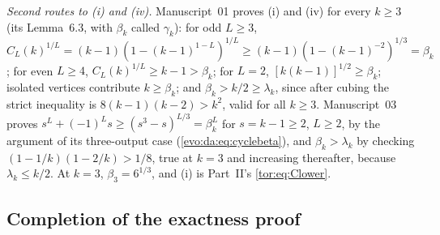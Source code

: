 \documentclass[11pt,a4paper]{article}
\numberwithin{equation}{section}
\theoremstyle{definition}
\theoremstyle{remark}
\begin{document}
\noindent\emph{Second routes to (i) and (iv).} Manuscript~01 proves (i) and
(iv) for every $k\ge3$ (its Lemma~6.3, with $\beta_k$ called $\gamma_k$): for
odd $L\ge3$, $C_L(k)^{1/L}=(k-1)(1-(k-1)^{1-L})^{1/L}\ge(k-1)(1-(k-1)^{-2})^{1/3}
=\beta_k$; for even $L\ge4$, $C_L(k)^{1/L}\ge k-1>\beta_k$; for $L=2$,
$[k(k-1)]^{1/2}\ge\beta_k$; isolated vertices contribute $k\ge\beta_k$; and
$\beta_k>k/2\ge\lambda_k$, since after cubing the strict inequality is
$8(k-1)(k-2)>k^2$, valid for all $k\ge3$. Manuscript~03 proves
$s^L+(-1)^Ls\ge(s^3-s)^{L/3}=\beta_k^L$ for $s=k-1\ge2$, $L\ge2$, by the
argument of its three-output case (\eqref{evo:da:eq:cyclebeta}), and
$\beta_k>\lambda_k$ by checking $(1-1/k)(1-2/k)>1/8$, true at $k=3$ and
increasing thereafter, because $\lambda_k\le k/2$. At $k=3$,
$\beta_3=6^{1/3}$, and (i) is Part~II's \eqref{tor:eq:Clower}.

\subsection{Completion of the exactness proof}
\end{document}
